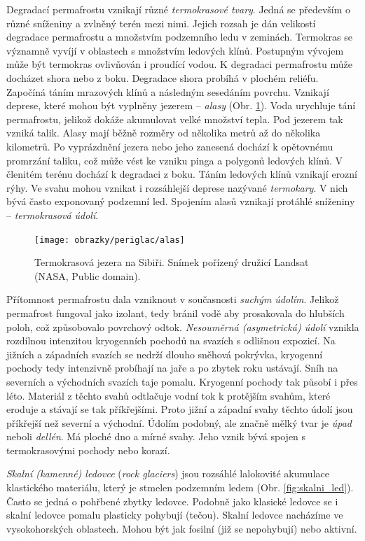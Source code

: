 Degradací permafrostu vznikají různé \emph{termokrasové tvary}. Jedná se především o různé sníženiny a zvlněný terén mezi nimi. Jejich rozsah je dán velikostí degradace permafrostu a množstvím podzemního ledu v zeminách. Termokras se významně vyvíjí v oblastech s množstvím ledových klínů. Postupným vývojem může být termokras ovlivňován i proudící vodou. K degradaci permafrostu může docházet shora nebo z boku. Degradace shora probíhá v plochém reliéfu. Započíná táním mrazových klínů a následným sesedáním povrchu. Vznikají deprese, které mohou být vyplněny jezerem -- \emph{alasy} (Obr. \ref{fig:alas}). Voda urychluje tání permafrostu, jelikož dokáže akumulovat velké množství tepla. Pod jezerem tak vzniká talik. Alasy mají běžně rozměry od několika metrů až do několika kilometrů. Po vyprázdnění jezera nebo jeho zanesená dochází k opětovnému promrzání taliku, což může vést ke vzniku pinga a polygonů ledových klínů. V členitém terénu dochází k degradaci z boku. Táním ledových klínů vznikají erozní rýhy. Ve svahu mohou vznikat i rozsáhlejší deprese nazývané \emph{termokary}. V nich bývá často exponovaný podzemní led.  Spojením alasů vznikají protáhlé sníženiny -- \emph{termokrasová údolí}. 

\begin{figure}[t]
	\centering
	\texttt{[image: obrazky/periglac/alas]}
	\caption{Termokrasová jezera na Sibiři. Snímek pořízený družicí Landsat (NASA, Public domain).}
	\label{fig:alas}
\end{figure}

Přítomnost permafrostu dala vzniknout v současnosti \emph{suchým údolím}. Jelikož permafrost fungoval jako izolant, tedy bránil vodě aby prosakovala do hlubších poloh, což způsobovalo povrchový odtok. \emph{Nesouměrná (asymetrická) údolí} vznikla rozdílnou intenzitou kryogenních pochodů na svazích s odlišnou expozicí. Na jižních a západních svazích se nedrží dlouho sněhová pokrývka, kryogenní pochody tedy intenzivně probíhají na jaře a po zbytek roku ustávají. Sníh na severních a východních svazích taje pomalu. Kryogenní pochody tak působí i přes léto. Materiál z těchto svahů odtlačuje vodní tok k protějším svahům, které eroduje a stávají se tak příkřejšími. Proto jižní a západní svahy těchto údolí jsou příkřejší než severní a východní. Údolím podobný, ale značně mělký tvar je \emph{úpad} neboli \emph{dellén}. Má ploché dno a mírné svahy. Jeho vznik bývá spojen s termokrasovými pochody nebo korazí. 

\emph{Skalní (kamenné) ledovce} (\textit{rock glaciers}) jsou rozsáhlé lalokovité akumulace klastického materiálu, který je stmelen podzemním ledem (Obr. \ref{fig:skalni_led}). Často se jedná o pohřbené zbytky ledovce. Podobně jako klasické ledovce se i skalní ledovce pomalu plasticky pohybují (tečou). Skalní ledovce nacházíme ve vysokohorských oblastech. Mohou být jak fosilní (již se nepohybují) nebo aktivní. 

